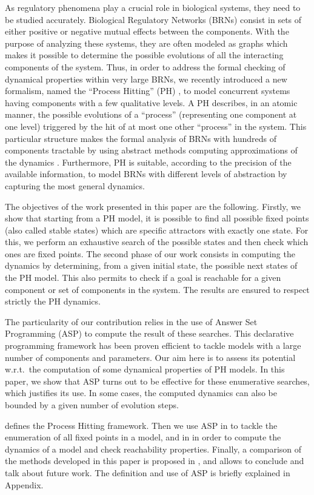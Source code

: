 As regulatory phenomena play a crucial role in biological systems, they need to
be studied accurately. Biological Regulatory Networks (BRNs) consist in sets
of either positive or negative mutual effects between the components. With the
purpose of analyzing these systems, they are often modeled as graphs which makes
it possible to determine the possible evolutions of all the interacting components of the system. Thus, in order to address the formal checking of dynamical properties within very large BRNs, we recently introduced a new formalism, named the ``Process Hitting'' (PH) \cite{PMR10-TCSB}, to model concurrent systems having components with a few qualitative levels. A PH describes, in an atomic manner, the possible evolutions of a ``process'' (representing one component at one level) triggered by the hit of at most one other ``process'' in the system. This particular structure makes the formal analysis of BRNs with hundreds of components tractable by using abstract methods computing approximations of the dynamics \cite{PMR12-MSCS}. Furthermore, PH is suitable, according to the precision of the available information, to model BRNs with different levels of abstraction by capturing the most general dynamics.

The objectives of the work presented in this paper are the following.
Firstly, we show that starting from a PH model, it is possible to find all possible
fixed points (also called stable states)
which are specific attractors with exactly one state. %
For this, we perform an exhaustive search of the possible states and then check which ones are fixed points.
The second phase of our work consists in computing the dynamics by determining, from a given initial state, the possible next states of the PH model.
This also permits to check if a goal is reachable for a given component or set of components in the system.
The results are ensured to respect strictly the PH dynamics.

The particularity of our contribution relies in the use of Answer Set Programming
(ASP) %
to compute the result of these searches.
This declarative programming framework has been proven efficient
to tackle models with a large number of components and parameters.
Our aim here is to assess its potential w.r.t.\ the computation
of some dynamical properties of PH models.
In this paper, we show that ASP turns out to be effective
for these enumerative searches, which justifies its use.
In some cases, the computed dynamics can also be bounded by a given
number of evolution steps.

 defines
the Process Hitting framework.
Then we use ASP in  to tackle the enumeration of all fixed points in a model,
and in  in order to compute the dynamics of a model and check reachability properties.
Finally, a comparison of the methods developed in this paper is proposed in ,
and  allows to conclude and talk about future work.
The definition and use of ASP is briefly explained in Appendix.
